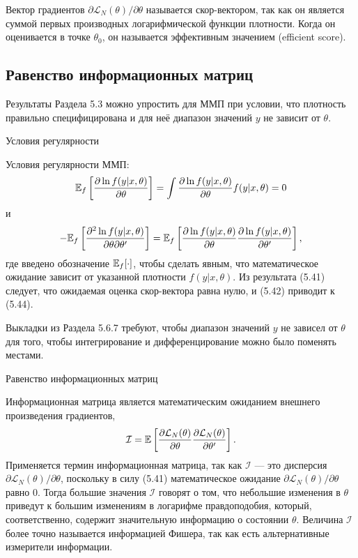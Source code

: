 Вектор градиентов $\partial \mathcal{L}_{N}(\theta) / \partial \theta$ называется скор-вектором, так как он является суммой первых производных логарифмической функции плотности. Когда он оценивается в точке $\theta_0$, он называется эффективным значением (efficient score).

\subsection{Равенство информационных матриц}

Результаты Раздела 5.3 можно упростить для ММП при условии, что плотность правильно специфицирована и для неё диапазон значений $y$ не зависит от $\theta$.

\begin{center}
Условия регулярности
\end{center}

Условия регулярности ММП: 
\begin{equation}
\mathbb{E}_{f} \left[ \frac{\partial \ln f(y|x,\theta)}{\partial \theta} \right] = \int \frac{\partial \ln f(y|x,\theta)}{\partial \theta} f(y|x,\theta)=0
\end{equation}
и
\begin{equation}
-\mathbb{E}_{f} \left[ \frac{\partial^2 \ln f(y|x,\theta)}{\partial \theta \partial \theta'} \right] = \mathbb{E}_{f} \left[ \frac{\partial \ln f(y|x,\theta)}{\partial \theta} \frac{\partial \ln f(y|x,\theta)}{\partial \theta'}\right],
\end{equation}
где введено обозначение $\mathbb{E}_{f}[\cdot]$, чтобы сделать явным, что математическое ожидание зависит от указанной плотности $f(y|x,\theta)$. Из результата (5.41) следует, что ожидаемая оценка скор-вектора равна нулю, и (5.42) приводит к (5.44).

Выкладки из Раздела 5.6.7 требуют, чтобы диапазон значений $y$ не зависел от $\theta$ для того, чтобы интегрирование и дифференцирование можно было поменять местами.

\begin{center}
Равенство информационных матриц
\end{center}

Информационная матрица является математическим ожиданием внешнего произведения градиентов,
\begin{equation}
\mathcal{I}=\mathbb{E} \left[ \frac{\partial \mathcal{L}_{N}(\theta)}{\partial \theta} \frac{\partial \mathcal{L}_{N}(\theta)}{\partial \theta'}\right].
\end{equation}
Применяется термин информационная матрица, так как $\mathcal{I}$ --- это дисперсия $\partial \mathcal{L}_{N}(\theta) / \partial \theta$, поскольку в силу (5.41) математическое ожидание $\partial \mathcal{L}_{N}(\theta) / \partial \theta$ равно 0. Тогда большие значения $\mathcal{I}$ говорят о том, что небольшие изменения в $\theta$ приведут к большим изменениям в логарифме правдоподобия, который, соответственно, содержит значительную информацию о состоянии $\theta$. Величина $\mathcal{I}$ более точно называется информацией Фишера, так как есть альтернативные измерители информации.


